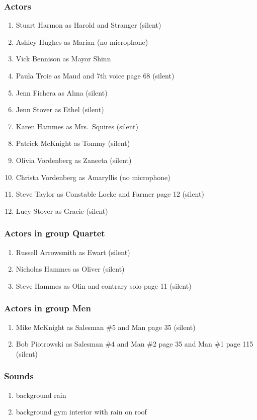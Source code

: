 \subsubsection{Actors}
\begin{enumerate}
\item Stuart Harmon as Harold and Stranger (silent)
\item Ashley Hughes as Marian (no microphone)
\item Vick Bennison as Mayor Shinn
\item Paula Troie as Maud and 7th voice page 68 (silent)
\item Jenn Fichera as Alma (silent)
\item Jenn Stover as Ethel (silent)
\item Karen Hammes as Mrs.~Squires (silent)
\item Patrick McKnight as Tommy (silent)
\item Olivia Vordenberg as Zaneeta (silent)
\item Christa Vordenberg as Amaryllis (no microphone)
\item Steve Taylor as Constable Locke and Farmer page 12 (silent)
\item Lucy Stover as Gracie (silent)
\end{enumerate}
\subsubsection{Actors in group Quartet}
\begin{enumerate}
\item Russell Arrowsmith as Ewart (silent)
\item Nicholas Hammes as Oliver (silent)
\item Steve Hammes as Olin and contrary solo page 11 (silent)
\end{enumerate}
\subsubsection{Actors in group Men}
\begin{enumerate}
\item Mike McKnight as Salesman \#5 and Man page 35 (silent)
\item Bob Piotrowski as Salesman \#4 and Man \#2 page 35 and Man \#1 page 115 (silent)
\end{enumerate}

\subsubsection{Sounds}
\begin{enumerate}
\item background rain
\item background gym interior with rain on roof
\end{enumerate}
